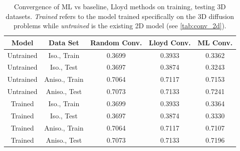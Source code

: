\documentclass{article}
\begin{document}
\begin{table}[h]
  \centering
  \begin{tabular}{c c c c c}
    \textbf{Model} & \textbf{Data Set} & \textbf{Random Conv.} & \textbf{Lloyd Conv.} & \textbf{ML Conv.} \\
    \hline
    Untrained & Iso., Train & 0.3699 & 0.3933 & 0.3362 \\
    Untrained & Iso., Test & 0.3697 & 0.3874 & 0.3243 \\
    \hline
    Untrained & Aniso., Train & 0.7064 & 0.7117 & 0.7153 \\
    Untrained & Aniso., Test & 0.7073 & 0.7133 & 0.7241 \\
    \hline
    \hline
    Trained & Iso., Train & 0.3699 & 0.3933 & 0.3364 \\
    Trained & Iso., Test & 0.3697 & 0.3874 & 0.3330 \\
    \hline
    Trained & Aniso., Train & 0.7064 & 0.7117 & 0.7107 \\
    Trained & Aniso., Test & 0.7073 & 0.7133 & 0.7196 \\
    \hline
  \end{tabular}
  \caption{Convergence of ML vs baseline, Lloyd methods on training, testing 3D datasets. \textit{Trained} refers to the model trained specifically on the 3D diffusion problems while \textit{untrained} is the existing 2D model (see \cref{tab:conv_2d}).}
  \label{tab:conv_3d}
\end{table}
\end{document}
